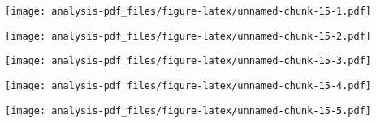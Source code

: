\documentclass[
]{article}
\newenvironment{Shaded}{\begin{snugshade}}{\end{snugshade}}
\newcommand{\KeywordTok}[1]{\textcolor[rgb]{0.13,0.29,0.53}{\textbf{#1}}}
\newcommand{\NormalTok}[1]{#1}
\newcommand{\OperatorTok}[1]{\textcolor[rgb]{0.81,0.36,0.00}{\textbf{#1}}}
\begin{document}
\begin{Shaded}
\end{Shaded}

\texttt{[image: analysis-pdf\_files/figure-latex/unnamed-chunk-15-1.pdf]}

\begin{Shaded}
\end{Shaded}

\texttt{[image: analysis-pdf\_files/figure-latex/unnamed-chunk-15-2.pdf]}

\begin{Shaded}
\end{Shaded}

\texttt{[image: analysis-pdf\_files/figure-latex/unnamed-chunk-15-3.pdf]}

\begin{Shaded}
\end{Shaded}

\texttt{[image: analysis-pdf\_files/figure-latex/unnamed-chunk-15-4.pdf]}

\begin{Shaded}
\end{Shaded}

\texttt{[image: analysis-pdf\_files/figure-latex/unnamed-chunk-15-5.pdf]}

\begin{Shaded}
\end{Shaded}
\end{document}
